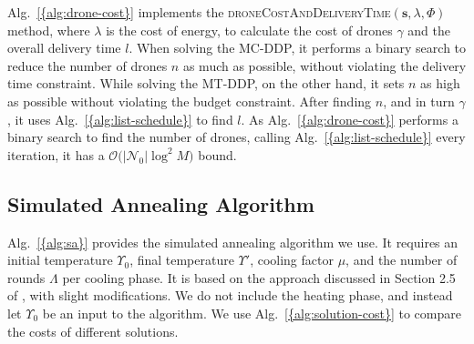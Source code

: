 \documentclass[journal]{IEEEtran}
\begin{document}
{Alg.~\ref{{alg:drone-cost}}} implements the \textsc{droneCostAndDeliveryTime}$({\ensuremath{\mathbf{s}}},{\ensuremath{\lambda}},{\ensuremath{\Phi}})$ method, where ${\ensuremath{\lambda}}$ is the cost of energy, to calculate the cost of drones ${\ensuremath{\gamma}}$ and the overall delivery time ${\ensuremath{l}}$. When solving the MC-DDP, it performs a binary search to reduce the number of drones ${\ensuremath{n}}$ as much as possible, without violating the delivery time constraint. While solving the MT-DDP, on the other hand, it sets ${\ensuremath{n}}$ as high as possible without violating the budget constraint. After finding ${\ensuremath{n}}$, and in turn ${\ensuremath{\gamma}}$, it uses {Alg.~\ref{{alg:list-schedule}}} to find ${\ensuremath{l}}$. As {Alg.~\ref{{alg:drone-cost}}} performs a binary search to find the number of drones, calling {Alg.~\ref{{alg:list-schedule}}} every iteration, it has a ${\ensuremath{\mathcal{O}\bigl({|{\ensuremath{{\ensuremath{\mathcal{N}}}_{0}}}|\log^2{\ensuremath{M}}}\bigr)}}$ bound.

\subsection{Simulated Annealing Algorithm}
\label{ssec:sa-algorithm}

{Alg.~\ref{{alg:sa}}} provides the simulated annealing algorithm we use. It requires an initial temperature ${\ensuremath{{\ensuremath{\Upsilon}}_0}}$, final temperature ${\ensuremath{{\ensuremath{\Upsilon}}'}}$, cooling factor ${\ensuremath{\mu}}$, and the number of rounds ${\ensuremath{\Lambda}}$ per cooling phase. It is based on the approach discussed in Section 2.5 of \cite{Kaku2003}, with slight modifications. We do not include the heating phase, and instead let ${\ensuremath{{\ensuremath{\Upsilon}}_0}}$ be an input to the algorithm. We use {Alg.~\ref{{alg:solution-cost}}} to compare the costs of different solutions.
\end{document}
